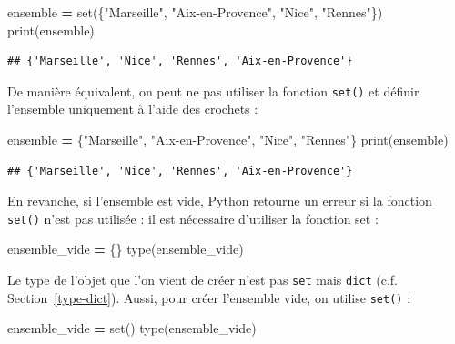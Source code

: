 \documentclass[12pt,]{book}
\newenvironment{Shaded}{\begin{snugshade}}{\end{snugshade}}
\newcommand{\StringTok}[1]{\textcolor[rgb]{0.31,0.60,0.02}{#1}}
\newcommand{\OperatorTok}[1]{\textcolor[rgb]{0.81,0.36,0.00}{\textbf{#1}}}
\newcommand{\BuiltInTok}[1]{#1}
\newcommand{\NormalTok}[1]{#1}
\numberwithin{equation}{section}
\numberwithin{countremarque}{section}
\begin{document}
\begin{Shaded}
\begin{Highlighting}[]
\NormalTok{ensemble }\OperatorTok{=} \BuiltInTok{set}\NormalTok{(\{}\StringTok{"Marseille"}\NormalTok{, }\StringTok{"Aix-en-Provence"}\NormalTok{, }\StringTok{"Nice"}\NormalTok{, }\StringTok{"Rennes"}\NormalTok{\})}
\BuiltInTok{print}\NormalTok{(ensemble)}
\end{Highlighting}
\end{Shaded}

\begin{lstlisting}
## {'Marseille', 'Nice', 'Rennes', 'Aix-en-Provence'}
\end{lstlisting}

De manière équivalent, on peut ne pas utiliser la fonction
\texttt{set()} et définir l'ensemble uniquement à l'aide des crochets :

\begin{Shaded}
\begin{Highlighting}[]
\NormalTok{ensemble }\OperatorTok{=}\NormalTok{ \{}\StringTok{"Marseille"}\NormalTok{, }\StringTok{"Aix-en-Provence"}\NormalTok{, }\StringTok{"Nice"}\NormalTok{, }\StringTok{"Rennes"}\NormalTok{\}}
\BuiltInTok{print}\NormalTok{(ensemble)}
\end{Highlighting}
\end{Shaded}

\begin{lstlisting}
## {'Marseille', 'Nice', 'Rennes', 'Aix-en-Provence'}
\end{lstlisting}

En revanche, si l'ensemble est vide, Python retourne un erreur si la
fonction \texttt{set()} n'est pas utilisée : il est nécessaire
d'utiliser la fonction set :

\begin{Shaded}
\begin{Highlighting}[]
\NormalTok{ensemble_vide }\OperatorTok{=}\NormalTok{ \{\}}
\BuiltInTok{type}\NormalTok{(ensemble_vide)}
\end{Highlighting}
\end{Shaded}

Le type de l'objet que l'on vient de créer n'est pas \texttt{set} mais
\texttt{dict} (c.f. Section~\ref{type-dict}). Aussi, pour créer
l'ensemble vide, on utilise \texttt{set()} :

\begin{Shaded}
\begin{Highlighting}[]
\NormalTok{ensemble_vide }\OperatorTok{=} \BuiltInTok{set}\NormalTok{()}
\BuiltInTok{type}\NormalTok{(ensemble_vide)}
\end{Highlighting}
\end{Shaded}
\end{document}
